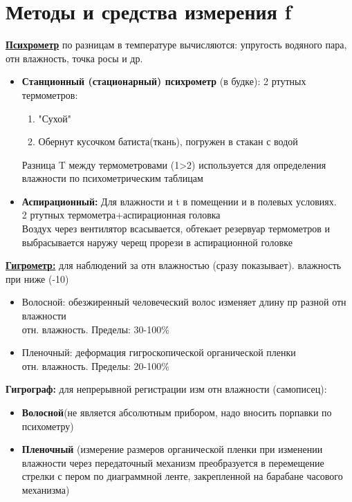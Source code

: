 
\section{Методы и средства измерения f}
\underline{\textbf{Психрометр}} по разницам в температуре вычисляются: упругость водяного пара, отн влажность, точка росы и др.
\begin{itemize} 
	\item \textbf{Станционный (стационарный) психрометр} (в будке): 2 ртутных термометров: 	
	\begin{enumerate} 
		\item "Сухой" 
		\item Обернут кусочком батиста(ткань), погружен в стакан с водой 
	\end{enumerate} 	
	Разница T между термометровами (1>2) используется для определения влажности по психометрическим таблицам
	\item\textbf{Аспирационный:} Для влажности и t в помещении и в полевых условиях. \\ 
	2 ртутных термометра+аспирационная головка\\
	Воздух через вентилятор всасывается, обтекает резервуар термометров и выбрасывается наружу черещ прорези в аспирационной головке
\end{itemize} 

\underline{\textbf{Гигрометр:}} для наблюдений за отн влажностью (сразу показывает). влажность при ниже (-10)\celsius 
\begin{itemize} 
	\item Волосной: обезжиренный человеческий волос изменяет длину пр разной отн влажности\\
	отн. влажность. Пределы: 30-100\% 
	\item Пленочный: деформация гигроскопической органической пленки\\
	отн. влажность. Пределы: 20-100\% 
\end{itemize} 

\textbf{Гигрограф:} для непрерывной регистрации изм отн влажности  (самописец):
\begin{itemize}
	\item \textbf{Волосной}(не является абсолютным прибором, надо вносить порпавки по психометру)
	\item  \textbf{Пленочный} (измерение размеров органической пленки при изменении влажности через передаточный механизм преобразуется в перемещение стрелки с пером по диаграммной ленте, закрепленной на барабане часового механизма)
\end{itemize}

